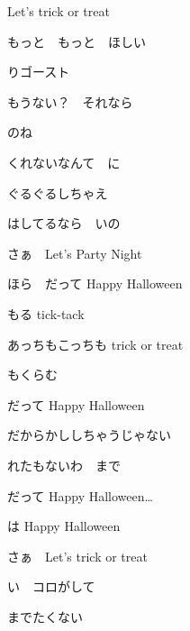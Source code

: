 Let's trick or treat

\bigskip

もっと　もっと　ほしい

りゴースト

もうない？　それなら

のね

\bigskip

くれないなんて　に

ぐるぐるしちゃえ

はしてるなら　いの

さぁ　Let's Party Night

\bigskip

ほら　だって Happy Halloween

もる tick-tack

あっちもこっちも trick or treat

もくらむ

だって Happy Halloween

だからかししちゃうじゃない

れたもないわ　まで

\bigskip

だって Happy Halloween…

\bigskip

は Happy Halloween

さぁ　Let's trick or treat

い　コロがして

までたくない
